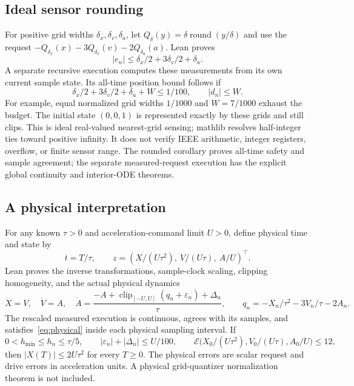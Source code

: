 \documentclass[10pt]{article}
\newcommand{\E}{\mathcal E}
\newcommand{\clip}{\operatorname{clip}}
\begin{document}
\subsection{Ideal sensor rounding}
For positive grid widths $\delta_x,\delta_v,\delta_a$, let $Q_\delta(y)=\delta\operatorname{round}(y/\delta)$ and use the request $-Q_{\delta_x}(x)-3Q_{\delta_v}(v)-2Q_{\delta_a}(a)$. Lean proves
\[
 |e_n|\le\delta_x/2+3\delta_v/2+\delta_a.
\]
A separate recursive execution computes these measurements from its own current sample state. Its all-time position bound follows if
\begin{equation}\label{eq:roundbudget}
 \delta_x/2+3\delta_v/2+\delta_a+W\le1/100,\qquad |d_n|\le W.
\end{equation}
For example, equal normalized grid widths $1/1000$ and $W=7/1000$ exhaust the budget. The initial state $(0,0,1)$ is represented exactly by these grids and still clips. This is ideal real-valued nearest-grid sensing; mathlib resolves half-integer ties toward positive infinity. It does not verify IEEE arithmetic, integer registers, overflow, or finite sensor range. The rounded corollary proves all-time safety and sample agreement; the separate measured-request execution has the explicit global continuity and interior-ODE theorems.

\subsection{A physical interpretation}\label{sec:physical}
For any known $\tau>0$ and acceleration-command limit $U>0$, define physical time and state by
\[
 t=T/\tau,\qquad z=(X/(U\tau^2),\ V/(U\tau),\ A/U)^\top.
\]
Lean proves the inverse transformations, sample-clock scaling, clipping homogeneity, and the actual physical dynamics
\begin{equation}\label{eq:physical}
 \dot X=V,\quad\dot V=A,\quad
 \dot A=\frac{-A+\clip_{[-U,U]}(q_n+\varepsilon_n)+\Delta_n}{\tau},\qquad
 q_n=-X_n/\tau^2-3V_n/\tau-2A_n.
\end{equation}
The rescaled measured execution is continuous, agrees with its samples, and satisfies~\eqref{eq:physical} inside each physical sampling interval. If
\[
 0<h_{\min}\le h_n\le\tau/5,\qquad
 |\varepsilon_n|+|\Delta_n|\le U/100,\qquad
 \E\bigl(X_0/(U\tau^2),V_0/(U\tau),A_0/U\bigr)\le12,
\]
then $|X(T)|\le2U\tau^2$ for every $T\ge0$. The physical errors are scalar request and drive errors in acceleration units. A physical grid-quantizer normalization theorem is not included.
\end{document}
